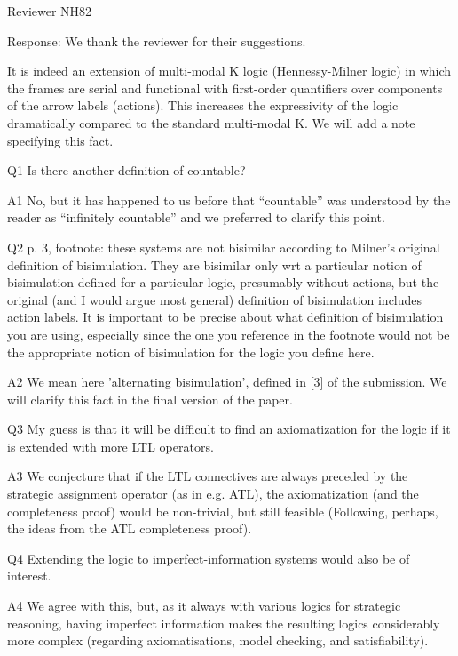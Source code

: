 Reviewer NH82

Response: We thank the reviewer for their suggestions. 

It is indeed an extension of multi-modal K logic (Hennessy-Milner logic) in which the frames are serial and functional with first-order quantifiers over components of the arrow labels (actions). This increases the expressivity of the logic dramatically compared to the standard multi-modal K. We will add a note specifying this fact. 

Q1  Is there another definition of countable?

A1 No, but it has happened to us before that “countable” was understood by the reader as “infinitely countable” and we preferred to clarify this point. 

Q2 p. 3, footnote: these systems are not bisimilar according to Milner's original definition of bisimulation. They are bisimilar only wrt a particular notion of bisimulation defined for a particular logic, presumably without actions, but the original (and I would argue most general) definition of bisimulation includes action labels. It is important to be precise about what definition of bisimulation you are using, especially since the one you reference in the footnote would not be the appropriate notion of bisimulation for the logic you define here.

A2 We mean here 'alternating bisimulation', defined in [3] of the submission. We will clarify this fact in the final version of the paper. 

Q3 My guess is that it will be difficult to find an axiomatization for the logic if it is extended with more LTL operators.

A3 We conjecture that if the LTL connectives are always preceded by the strategic assignment operator (as in e.g. ATL), the axiomatization (and the completeness proof) would be non-trivial, but still feasible (Following, perhaps, the ideas from the ATL completeness proof). 




 Q4 Extending the logic to imperfect-information systems would also be of interest.

 A4 We agree with this, but, as it always with various logics for strategic reasoning, having imperfect information makes the resulting logics considerably more complex (regarding axiomatisations, model checking, and satisfiability). 

